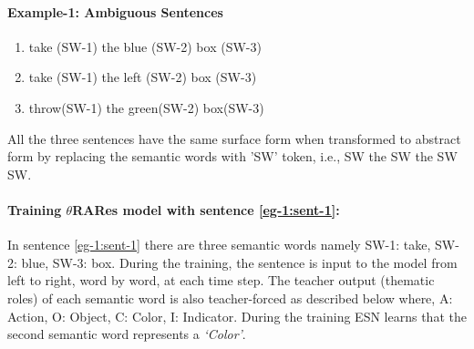\paragraph{Example-1: Ambiguous Sentences}

\begin{enumerate}[noitemsep]
\item take (SW-1) the blue (SW-2) box (SW-3) \label{eg-1:sent-1}
\item take (SW-1) the left (SW-2) box (SW-3) \label{eg-1:sent-2}
\item throw(SW-1) the green(SW-2) box(SW-3)  \label{eg-1:sent-3} 
\end{enumerate}

All the three sentences have the same surface form when transformed to abstract form by replacing the semantic words with 'SW' token, i.e., SW the SW the SW SW.

\paragraph{Training $\theta$RARes model with sentence \ref{eg-1:sent-1}:} In sentence \ref{eg-1:sent-1} there are three semantic words namely SW-1: take, SW-2: blue, SW-3: box. During the training, the sentence is input to the model from left to right, word by word, at each time step. The teacher output (thematic roles) of each semantic word is also teacher-forced as described below where, A: Action, O: Object, C: Color, I: Indicator. During the training ESN learns that the second semantic word represents a \textit{`Color'}.


